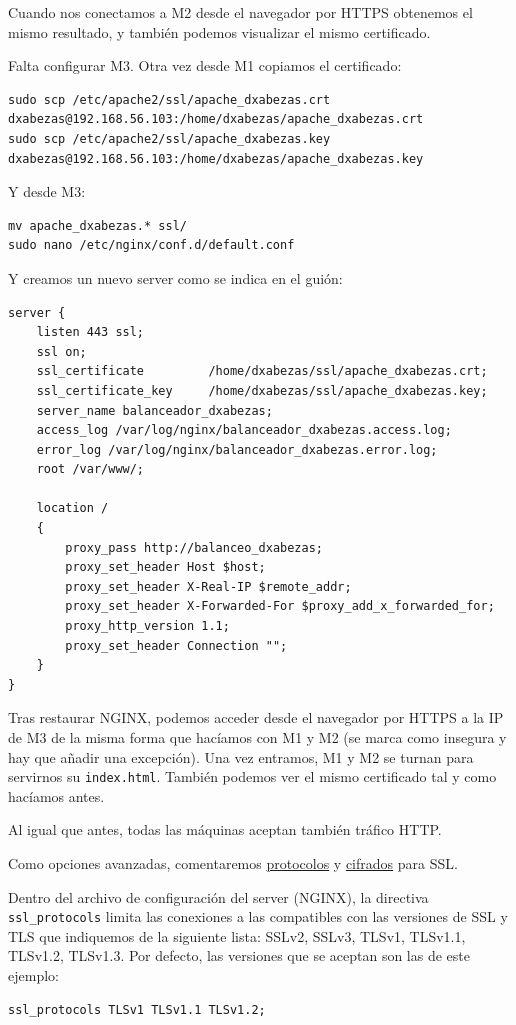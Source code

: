 \documentclass{article}
\begin{document}
Cuando nos conectamos a M2 desde el navegador por HTTPS obtenemos el mismo resultado, y también podemos visualizar el mismo
certificado.

Falta configurar M3. Otra vez desde M1 copiamos el certificado:

\begin{Verbatim}
sudo scp /etc/apache2/ssl/apache_dxabezas.crt dxabezas@192.168.56.103:/home/dxabezas/apache_dxabezas.crt
sudo scp /etc/apache2/ssl/apache_dxabezas.key dxabezas@192.168.56.103:/home/dxabezas/apache_dxabezas.key
\end{Verbatim}

Y desde M3:
\begin{Verbatim}
mv apache_dxabezas.* ssl/
sudo nano /etc/nginx/conf.d/default.conf
\end{Verbatim}

Y creamos un nuevo server como se indica en el guión:

\begin{Verbatim}[tabsize=4]
server {
	listen 443 ssl;
	ssl on;
	ssl_certificate         /home/dxabezas/ssl/apache_dxabezas.crt;
	ssl_certificate_key     /home/dxabezas/ssl/apache_dxabezas.key;
	server_name balanceador_dxabezas;
	access_log /var/log/nginx/balanceador_dxabezas.access.log;
	error_log /var/log/nginx/balanceador_dxabezas.error.log;
	root /var/www/;
	
	location /
	{
		proxy_pass http://balanceo_dxabezas;
		proxy_set_header Host $host;
		proxy_set_header X-Real-IP $remote_addr;
		proxy_set_header X-Forwarded-For $proxy_add_x_forwarded_for;
		proxy_http_version 1.1;
		proxy_set_header Connection "";
	}
}
\end{Verbatim}
Tras restaurar NGINX, podemos acceder desde el navegador por HTTPS a la IP de M3 de la misma forma que hacíamos con
M1 y M2 (se marca como insegura y hay que añadir una excepción). Una vez entramos, M1 y M2 se turnan para servirnos
su \texttt{index.html}. También podemos ver el mismo certificado tal y como hacíamos antes.

Al igual que antes, todas las máquinas aceptan también tráfico HTTP.

Como opciones avanzadas, comentaremos \href{http://nginx.org/en/docs/http/ngx_http_ssl_module.html#ssl_protocols}{protocolos} y 
\href{http://nginx.org/en/docs/http/ngx_http_ssl_module.html#ssl_ciphers}{cifrados} para SSL. 

Dentro del archivo de configuración del server (NGINX), la directiva \texttt{ssl\_protocols} limita las conexiones a las compatibles con
las versiones de SSL y TLS que indiquemos de la siguiente lista: SSLv2, SSLv3, TLSv1, TLSv1.1, TLSv1.2, TLSv1.3.
Por defecto, las versiones que se aceptan son las de este ejemplo:
\begin{Verbatim}
ssl_protocols TLSv1 TLSv1.1 TLSv1.2;
\end{Verbatim}
\end{document}
